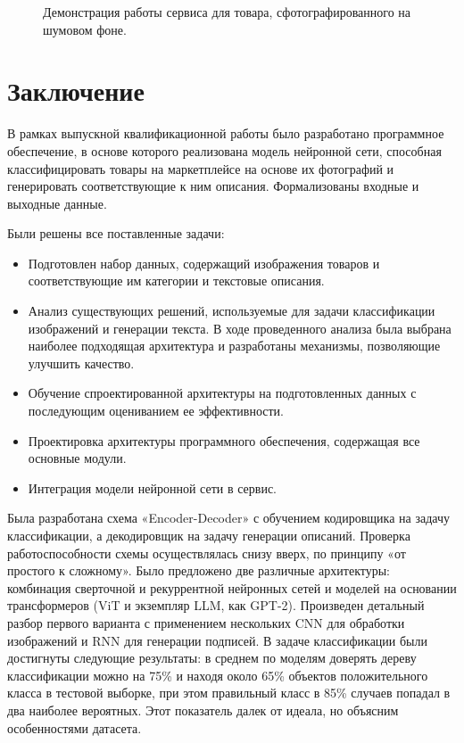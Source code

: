 \documentclass[a4paper,12pt]{extarticle}
\begin{document}
\begin{figure}[ht]
	\caption{Демонстрация работы сервиса для товара, сфотографированного на шумовом фоне.}
	\label{fig:telegram-mirror-description}
\end{figure}

\newpage

\newpage
\section*{Заключение}

В рамках выпускной квалификационной работы было разработано программное обеспечение, в основе которого реализована модель нейронной сети, способная классифицировать товары на маркетплейсе на основе их фотографий и генерировать соответствующие к ним описания. Формализованы входные и выходные данные.

Были решены все поставленные задачи:
\begin{itemize}
	\item Подготовлен набор данных, содержащий изображения товаров и соответствующие им категории и текстовые описания.
	\item Анализ существующих решений, используемые для задачи классификации изображений и генерации текста. В ходе проведенного анализа была выбрана наиболее подходящая архитектура и разработаны механизмы, позволяющие улучшить качество.
	\item Обучение спроектированной архитектуры на подготовленных данных с последующим оцениванием ее эффективности.
	\item Проектировка архитектуры программного обеспечения, содержащая все основные модули.
	\item Интеграция модели нейронной сети в сервис.
\end{itemize}

Была разработана схема «Encoder-Decoder» с обучением кодировщика на задачу классификации, а декодировщик на задачу генерации описаний. Проверка работоспособности схемы осуществлялась снизу вверх, по принципу «от простого к сложному». Было предложено две различные архитектуры: комбинация сверточной и рекуррентной нейронных сетей и моделей на основании трансформеров (ViT и экземпляр LLM, как GPT-2). Произведен детальный разбор первого варианта с применением нескольких CNN для обработки изображений и RNN для генерации подписей. В задаче классификации были достигнуты следующие результаты: в среднем по моделям доверять дереву классификации можно на 75\% и находя около 65\% объектов положительного класса в тестовой выборке, при этом правильный класс в 85\% случаев попадал в два наиболее вероятных. Этот показатель далек от идеала, но объясним особенностями датасета.
\end{document}
